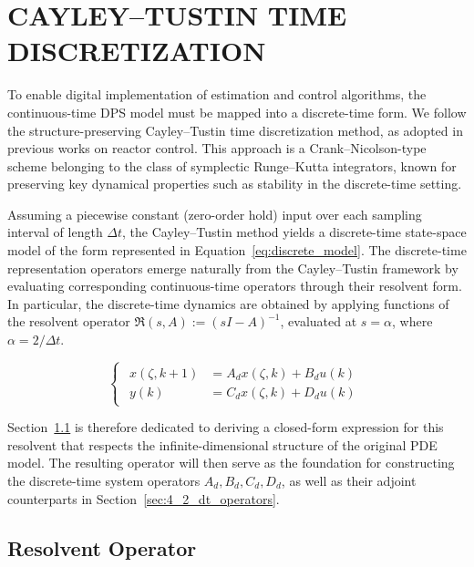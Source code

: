 \section{CAYLEY--TUSTIN TIME DISCRETIZATION} \label{sec:4_dt}

To enable digital implementation of estimation and control algorithms, the continuous-time DPS model must be mapped into a discrete-time form. We follow the structure-preserving Cayley--Tustin time discretization method, as adopted in previous works on reactor control\autocite{Khatibi2021Model, Moadeli2025Model,Moadeli2025Observer}. This approach is a Crank--Nicolson-type scheme belonging to the class of symplectic Runge--Kutta integrators, known for preserving key dynamical properties such as stability in the discrete-time setting\autocite{havu2007cayley, hairer2006geometric}.

Assuming a piecewise constant (zero-order hold) input over each sampling interval of length $\Delta t$, the Cayley--Tustin method yields a discrete-time state-space model of the form represented in Equation~\eqref{eq:discrete_model}. The discrete-time representation operators emerge naturally from the Cayley--Tustin framework by evaluating corresponding continuous-time operators through their resolvent form. In particular, the discrete-time dynamics are obtained by applying functions of the resolvent operator $\mathfrak{R}(s, A) := (sI - A)^{-1}$, evaluated at $s = \alpha$, where $\alpha = 2 / \Delta t$.

\begin{equation} \label{eq:discrete_model}
    \begin{cases}
        \begin{aligned}
        x(\zeta, k{+}1) &= A_d x(\zeta, k) + B_d u(k)\\
        y(k) & = C_d x(\zeta, k) + D_d u(k)
        \end{aligned}
    \end{cases}
\end{equation}

Section~\ref{sec:4_1_resolvent} is therefore dedicated to deriving a closed-form expression for this resolvent that respects the infinite-dimensional structure of the original PDE model. The resulting operator will then serve as the foundation for constructing the discrete-time system operators $A_d, B_d, C_d, D_d$, as well as their adjoint counterparts in Section~\ref{sec:4_2_dt_operators}.


\subsection{Resolvent Operator} \label{sec:4_1_resolvent}

